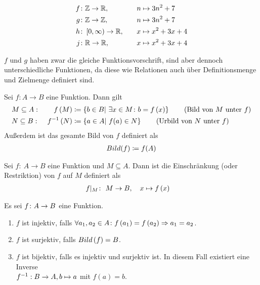 \begin{beispiel}
    \theoremescape
    \begin{alignat*}{2}
        f\colon &\mathbb{Z} \rightarrow \mathbb{R},\quad && n\mapsto 3n^2+7\\
        g\colon &\mathbb{Z} \rightarrow \mathbb{Z},\quad && n\mapsto 3n^2+7\\
        h\colon &\left[0, \infty\right) \rightarrow \mathbb{R},\quad && x\mapsto x^2+3x+4\\
        j\colon &\mathbb{R} \rightarrow \mathbb{R},\quad && x\mapsto x^2+3x+4\\
    \end{alignat*}
\end{beispiel}
\begin{bemerkung}
    $f$ und $g$ haben zwar die gleiche Funktionsvorschrift, sind aber dennoch unterschiedliche Funktionen, da diese wie Relationen auch über Definitionsmenge und Zielmenge definiert sind.
\end{bemerkung}

\begin{notation}
    Sei $f: A\rightarrow B$ eine Funktion.
    Dann gilt
    \begin{alignat*}{2}
        & M \subseteq A:~ & f\left(M\right) &\coloneqq \left\{b\in B|~\exists x\in M\colon b=f\left(x\right)\right\}\tag{Bild von $M$ unter $f$}\\
        & N \subseteq B:~ & f^{-1}\left(N\right) &\coloneqq \left\{a\in A|~f(a)\in N\right\}\tag{Urbild von $N$ unter $f$}
    \end{alignat*}
    Außerdem ist das gesamte Bild von $f$ definiert als
    \begin{align*}
        Bild(f) \coloneqq f(A)
    \end{align*}
\end{notation}
\begin{definition}
    Sei $f\colon~A \rightarrow B$ eine Funktion und $M \subseteq A$.
    Dann ist die Einschränkung (oder Restriktion) von $f$ auf $M$ definiert als
    \begin{align*}
        f|_{M}\colon&~M \rightarrow B,\quad x \mapsto f\left(x\right)
    \end{align*}
\end{definition}
\begin{definition}
    Es sei $f\colon A\rightarrow{} B$ eine Funktion.
    \theoremescape
    \begin{enumerate}[label=(\roman*)]
        \item $f$ ist injektiv, falls $\forall a_1, a_2 \in A\colon f\left(a_1\right) = f\left(a_2\right) \Rightarrow{} a_1 = a_2$.
        \item $f$ ist surjektiv, falls $Bild\left(f\right) = B$.
        \item $f$ ist bijektiv, falls es injektiv und surjektiv ist. In diesem Fall existiert eine Inverse\\ $f^{-1}: B\rightarrow{} A, b\mapsto a$ mit $f(a)=b$.
    \end{enumerate}
\end{definition}

